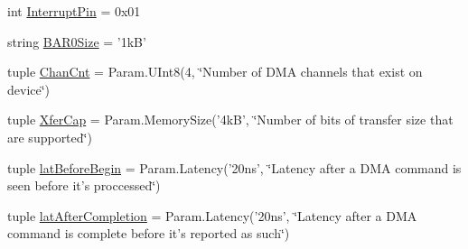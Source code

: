 \begin{DoxyCompactItemize}
int \hyperlink{classCopyEngine_1_1CopyEngine_a9b18e7e4ee8e0f835496c9106eb519d5}{InterruptPin} = 0x01
\item 
string \hyperlink{classCopyEngine_1_1CopyEngine_aefc407ca01c833e5dac341709110c5e2}{BAR0Size} = '1kB'
\item 
tuple \hyperlink{classCopyEngine_1_1CopyEngine_a62db8658b0c8694fae7c18a45a5b3879}{ChanCnt} = Param.UInt8(4, \char`\"{}Number of DMA channels that exist on device\char`\"{})
\item 
tuple \hyperlink{classCopyEngine_1_1CopyEngine_ae852302756ab6b484c727a185b42d98b}{XferCap} = Param.MemorySize('4kB', \char`\"{}Number of bits of transfer size that are supported\char`\"{})
\item 
tuple \hyperlink{classCopyEngine_1_1CopyEngine_af5297cce176584d7282d8d171dde6eb5}{latBeforeBegin} = Param.Latency('20ns', \char`\"{}Latency after a DMA command is seen before it's proccessed\char`\"{})
\item 
tuple \hyperlink{classCopyEngine_1_1CopyEngine_a33fa458abcf6b35912dd7274c6731a99}{latAfterCompletion} = Param.Latency('20ns', \char`\"{}Latency after a DMA command is complete before it's reported as such\char`\"{})
\end{DoxyCompactItemize}


